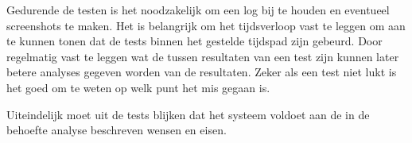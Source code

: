 Gedurende de testen is het noodzakelijk om een log bij te houden en eventueel screenshots te maken. Het is belangrijk om het tijdsverloop vast te leggen om aan te kunnen tonen dat de tests binnen het gestelde tijdspad zijn gebeurd. Door regelmatig vast te leggen wat de tussen resultaten van een test zijn kunnen later betere analyses gegeven worden van de resultaten. Zeker als een test niet lukt is het goed om te weten op welk punt het mis gegaan is.

Uiteindelijk moet uit de tests blijken dat het systeem voldoet aan de in de behoefte analyse beschreven wensen en eisen.
